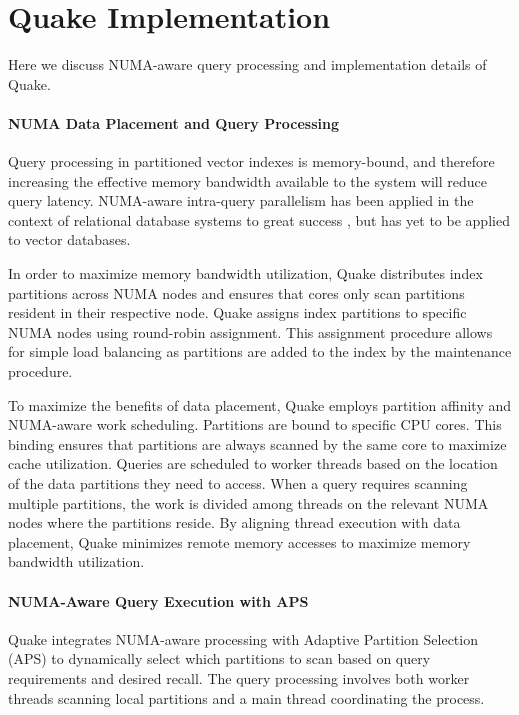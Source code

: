 \section{Quake Implementation}
\label{sec:numa_aware_query_processing}

Here we discuss NUMA-aware query processing and implementation details of Quake.

\paragraph{NUMA Data Placement and Query Processing} Query processing in partitioned vector indexes is memory-bound, and therefore increasing the effective memory bandwidth available to the system will reduce query latency. NUMA-aware intra-query parallelism has been applied in the context of relational database systems to great success \cite{10.1145/2588555.2610507, 10.14778/3015274.3015275}, but has yet to be applied to vector databases. 

In order to maximize memory bandwidth utilization, Quake distributes index partitions across NUMA nodes and ensures that cores only scan partitions resident in their respective node. Quake assigns index partitions to specific NUMA nodes using round-robin assignment. This assignment procedure allows for simple load balancing as partitions are added to the index by the maintenance procedure.

To maximize the benefits of data placement, Quake employs partition affinity and NUMA-aware work scheduling. Partitions are bound to specific CPU cores. This binding ensures that partitions are always scanned by the same core to maximize cache utilization. Queries are scheduled to worker threads based on the location of the data partitions they need to access. When a query requires scanning multiple partitions, the work is divided among threads on the relevant NUMA nodes where the partitions reside. By aligning thread execution with data placement, Quake minimizes remote memory accesses to maximize memory bandwidth utilization.


\paragraph{NUMA-Aware Query Execution with APS} Quake integrates NUMA-aware processing with Adaptive Partition Selection (APS) to dynamically select which partitions to scan based on query requirements and desired recall. The query processing involves both worker threads scanning local partitions and a main thread coordinating the process.

